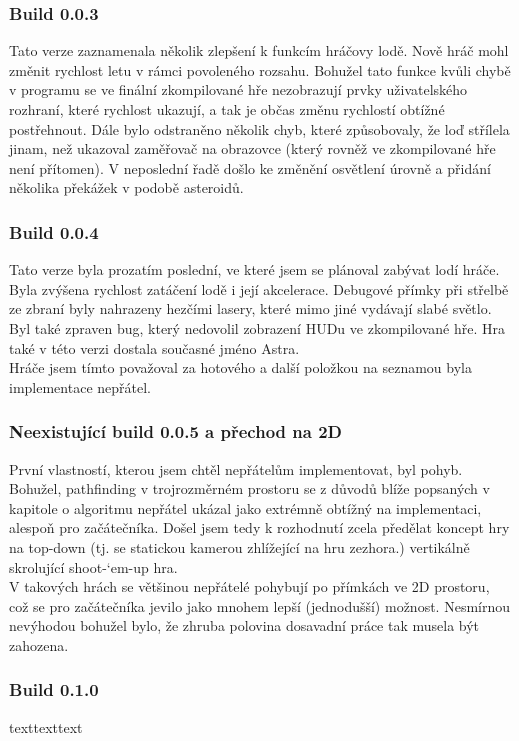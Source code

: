 \documentclass[12pt,a4paper,hidelinks]{article}
\begin{document}
\subsubsection{Build 0.0.3}
Tato verze zaznamenala několik zlepšení k funkcím hráčovy lodě. Nově hráč mohl změnit rychlost letu v rámci povoleného rozsahu. Bohužel tato funkce kvůli chybě v programu se ve finální zkompilované hře nezobrazují prvky uživatelského rozhraní, které rychlost ukazují, a tak je občas změnu rychlostí obtížné postřehnout. Dále bylo odstraněno několik chyb, které způsobovaly, že loď střílela jinam, než ukazoval zaměřovač na obrazovce (který rovněž ve zkompilované hře není přítomen). V neposlední řadě došlo ke změnění osvětlení úrovně a přidání několika překážek v podobě asteroidů.\\
\subsubsection{Build 0.0.4}
Tato verze byla prozatím poslední, ve které jsem se plánoval zabývat lodí hráče. Byla zvýšena rychlost zatáčení lodě i její akcelerace. Debugové přímky při střelbě ze zbraní byly nahrazeny hezčími lasery, které mimo jiné vydávají slabé světlo. Byl také zpraven bug, který nedovolil zobrazení HUDu ve zkompilované hře. Hra také v této verzi dostala současné jméno Astra.\\
Hráče jsem tímto považoval za hotového a další položkou na seznamou byla implementace nepřátel.\\
\subsubsection{Neexistující build 0.0.5 a přechod na 2D}
První vlastností, kterou jsem chtěl nepřátelům implementovat, byl pohyb. Bohužel, pathfinding v trojrozměrném prostoru se z důvodů blíže popsaných v kapitole o algoritmu nepřátel ukázal jako extrémně obtížný na implementaci, alespoň pro začátečníka. Došel jsem tedy k rozhodnutí zcela předělat koncept hry na top-down (tj. se statickou kamerou zhlížející na hru zezhora.) vertikálně skrolující shoot-‘em-up hra.\\
V takových hrách se většinou nepřátelé pohybují po přímkách ve 2D prostoru, což se pro začátečníka jevilo jako mnohem lepší (jednodušší) možnost. Nesmírnou nevýhodou bohužel bylo, že zhruba polovina dosavadní práce tak musela být zahozena.\\
\subsubsection{Build 0.1.0}
texttexttext\\
\end{document}
